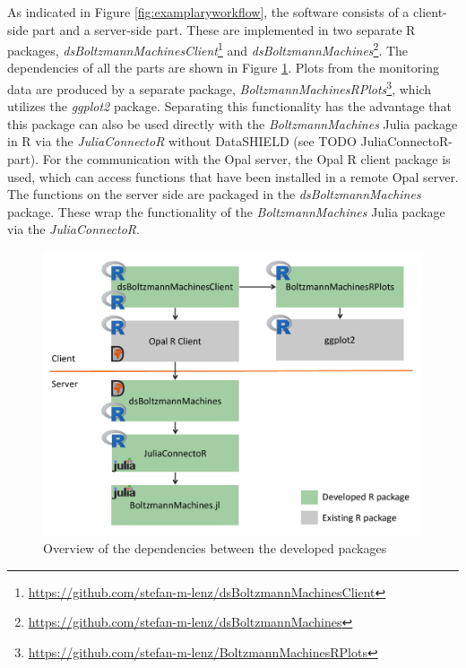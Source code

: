 \documentclass[12pt]{article}
\newcommand{\apkg}[1]{\emph{#1}}
\begin{document}
As indicated in Figure \ref{fig:examplaryworkflow}, the software consists of a client-side part and a server-side part.
These are implemented in two separate R packages, \apkg{dsBoltzmannMachinesClient}\footnote{\url{https://github.com/stefan-m-lenz/dsBoltzmannMachinesClient}} and \apkg{dsBoltzmannMachines}\footnote{\url{https://github.com/stefan-m-lenz/dsBoltzmannMachines}}.
The dependencies of all the parts are shown in Figure \ref{fig:dsBoltzmann_dependencies}.
Plots from the monitoring data are produced by a separate package, \apkg{BoltzmannMachinesRPlots}\footnote{\url{https://github.com/stefan-m-lenz/BoltzmannMachinesRPlots}}, which utilizes the \apkg{ggplot2} \citep{ggplot2} package.
Separating this functionality has the advantage that this package can also be used directly with the \apkg{BoltzmannMachines} Julia package in R via the \apkg{JuliaConnectoR} without DataSHIELD (see TODO JuliaConnectoR-part).
For the communication with the Opal server, the Opal R client package is used, which can access functions that have been installed in a remote Opal server.
The functions on the server side are packaged in the \apkg{dsBoltzmannMachines} package.
These wrap the functionality of the \apkg{BoltzmannMachines} Julia package via the \apkg{JuliaConnectoR}.

\begin{figure}[h]
   \centering
   \includegraphics[scale=0.6]{images/dsBoltzmannMachinesOverview.pdf}
   \caption{Overview of the dependencies between the developed packages}
   \label{fig:dsBoltzmann_dependencies}
 \end{figure}   
 
\end{document}
